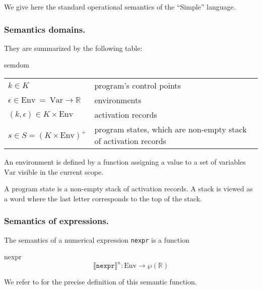 \documentclass[a4paper,11pt]{article}
\newcommand{\sem}[1]{\llbracket #1 \rrbracket}
\begin{document}
We give here the standard operational semantics of the ``Simple''
language.

\subsubsection{Semantics domains.}

They are summarized by the following table:
\htmlonly{\begin{quote}}
\begin{image}{semdom}
  \textcolor{black}{
    \begin{tabular}{ll}
      $k\in K$ & program's control points \\
      $\epsilon \in \mathrm{Env} ~=~ \mathrm{Var}\rightarrow \mathbb{R}$ &
      environments \\
      $(k,\epsilon)\in K\times\mathrm{Env}$ &
      activation records \\
      $s\in S=(K\times \mathrm{Env})^+$ &
      program states, which are non-empty stack of activation records
    \end{tabular}
}
  \end{image}
\htmlonly{\end{quote}}

An environment is defined by a function assigning a value to a set
of variables $\mathrm{Var}$ visible in the current scope.

A program state is a non-empty stack of activation records. A
stack is viewed as a word where the last letter corresponds to the
top of the stack.

\subsubsection{Semantics of expressions.}

The semantics of a numerical expression \texttt{nexpr}
is a function
\htmlonly{\begin{quote}}\begin{image}{nexpr}
  $$
  \sem{\texttt{nexpr}}^n : \mathrm{Env} \rightarrow \wp(\mathbb{R})
  $$
 \end{image}\htmlonly{\end{quote}}
We refer to \cite{mine04} for the precise definition of this semantic
function.
\end{document}
